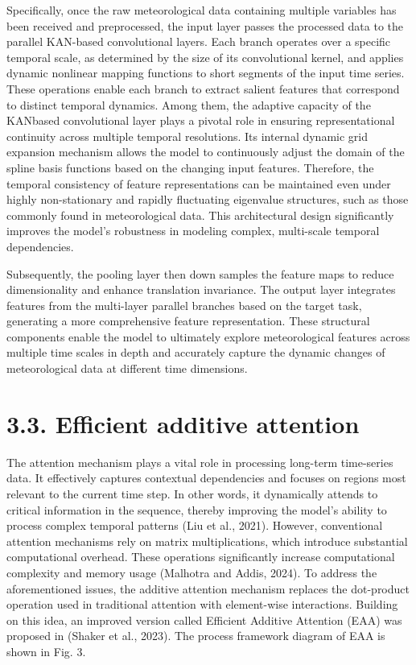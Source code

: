 \documentclass[
  10
]{article}
\begin{document}
Specifically, once the raw meteorological data containing multiple
variables has been received and preprocessed, the input layer passes the
processed data to the parallel KAN-based convolutional layers. Each
branch operates over a specific temporal scale, as determined by the
size of its convolutional kernel, and applies dynamic nonlinear mapping
functions to short segments of the input time series. These operations
enable each branch to extract salient features that correspond to
distinct temporal dynamics. Among them, the adaptive capacity of the
KANbased convolutional layer plays a pivotal role in ensuring
representational continuity across multiple temporal resolutions. Its
internal dynamic grid expansion mechanism allows the model to
continuously adjust the domain of the spline basis functions based on
the changing input features. Therefore, the temporal consistency of
feature representations can be maintained even under highly
non-stationary and rapidly fluctuating eigenvalue structures, such as
those commonly found in meteorological data. This architectural design
significantly improves the model's robustness in modeling complex,
multi-scale temporal dependencies.

Subsequently, the pooling layer then down samples the feature maps to
reduce dimensionality and enhance translation invariance. The output
layer integrates features from the multi-layer parallel branches based
on the target task, generating a more comprehensive feature
representation. These structural components enable the model to
ultimately explore meteorological features across multiple time scales
in depth and accurately capture the dynamic changes of meteorological
data at different time dimensions.

\section{3.3. Efficient additive
attention}\label{efficient-additive-attention}

The attention mechanism plays a vital role in processing long-term
time-series data. It effectively captures contextual dependencies and
focuses on regions most relevant to the current time step. In other
words, it dynamically attends to critical information in the sequence,
thereby improving the model's ability to process complex temporal
patterns (Liu et al., 2021). However, conventional attention mechanisms
rely on matrix multiplications, which introduce substantial
computational overhead. These operations significantly increase
computational complexity and memory usage (Malhotra and Addis, 2024). To
address the aforementioned issues, the additive attention mechanism
replaces the dot-product operation used in traditional attention with
element-wise interactions. Building on this idea, an improved version
called Efficient Additive Attention (EAA) was proposed in (Shaker et
al., 2023). The process framework diagram of EAA is shown in Fig. 3.
\end{document}
